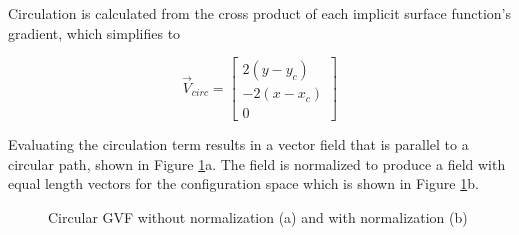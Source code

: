 \documentclass[numbered,pdftex]{ohio-etd}
\begin{document}
Circulation is calculated from the cross product of each implicit surface function's gradient, which simplifies to

\begin{equation}\label{eq:vcirc_circle}
\overrightarrow{V}_{circ} =  \begin{bmatrix}  2(y-y_c) \\[6pt] -2(x-x_c) \\[6pt] 0\end{bmatrix}
\end{equation}



\noindent
Evaluating the circulation term results in a vector field that is parallel to a circular path, shown in Figure \ref{fig:gvfCircCirculation}a. The field is normalized to produce a field with equal length vectors for the configuration space which is shown in Figure \ref{fig:gvfCircCirculation}b. 

\begin{figure}[H]
	\begin{subfigmatrix}{2}%
		\centering	
		\hspace*{0mm}
	\end{subfigmatrix}
	\caption{Circular GVF without normalization (a) and with normalization (b)}
	\label{fig:gvfCircCirculation}
\end{figure}
\end{document}
